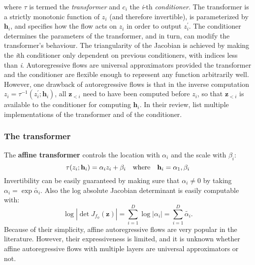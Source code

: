 \documentclass[english]{scrartcl}
\begin{document}
    where $\tau$ is termed the \textit{transformer} and $c_i$ the \textit{i}-th \textit{conditioner}.
    The transformer is a strictly monotonic function of $z_i$ (and therefore invertible), is parameterized by $\textbf{h}_i$, and specifies how the flow acts on $z_i$ in order to output $z_i^{\prime}$.
    The conditioner determines the parameters of the transformer, and in turn, can modify the transformer's behaviour.
    The triangularity of the Jacobian is achieved by making the \textit{i}th conditioner only dependent on previous conditioners, with indices less than \textit{i}.
    Autoregressive flows are universal approximators provided the transformer and the conditioner are flexible enough to represent any function arbitrarily well.
    However, one drawback of autoregressive flows is that in the inverse computation $z_i = \tau ^{-1} (z_i ^{\prime}; \textbf{h}_i)$, all $\textbf{z}_{<i}$ need to have been computed before $z_i$, so that $\textbf{z}_{<i}$ is available to the conditioner for computing $\textbf{h}_i$.
    In their review, \cite{papamakarios_normalizing_2019} list multiple implementations of the transformer and of the conditioner.

    \subsubsection{The transformer}

    The \textbf{affine transformer} controls the location with $\alpha_i$ and the scale with $\beta_i$:
    \begin{equation}
        \tau(z_i;\textbf{h}_i) = \alpha_i z_i +\beta _i \quad \text{where} \quad \textbf{h}_i = {\alpha_1, \beta_i}
    \end{equation}
    Invertibility can be easily guaranteed by making sure that $\alpha _i \neq 0$ by taking $\alpha _i = \exp \tilde{\alpha _i}$.
    Also the log absolute Jacobian determinant is easily computable with:
    \begin{equation}
        \log |\det J_{f_\phi}(\textbf{z})| = \sum _{i=1} ^{D} \log |\alpha _i| = \sum _{i=1} ^{D} \tilde{\alpha _i}.
    \end{equation}
    Because of their simplicity, affine autoregressive flows are very popular in the literature.
    However, their expressiveness is limited, and it is unknown whether affine autoregressive flows with multiple layers are universal approximators or not.
\end{document}
